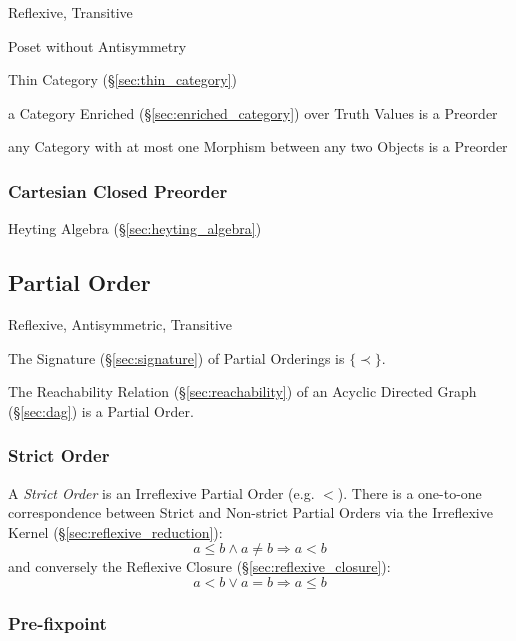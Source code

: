 Reflexive, Transitive

Poset without Antisymmetry

Thin Category (\S\ref{sec:thin_category})

a Category Enriched (\S\ref{sec:enriched_category}) over Truth Values
is a Preorder

any Category with at most one Morphism between any two Objects is a Preorder



\subsubsection{Cartesian Closed Preorder}\label{sec:cartesian_preorder}

Heyting Algebra (\S\ref{sec:heyting_algebra})



\subsection{Partial Order}\label{sec:partial_order}

Reflexive, Antisymmetric, Transitive

The Signature (\S\ref{sec:signature}) of Partial Orderings is
$\{\prec\}$.

The Reachability Relation (\S\ref{sec:reachability}) of an Acyclic
Directed Graph (\S\ref{sec:dag}) is a Partial Order.



\subsubsection{Strict Order}\label{sec:strict_order}

A \emph{Strict Order} is an Irreflexive Partial Order (e.g. $<$).
There is a one-to-one correspondence between Strict and Non-strict
Partial Orders via the Irreflexive Kernel
(\S\ref{sec:reflexive_reduction}):
\[
  a \leq b \wedge a \neq b \Rightarrow a < b
\]
and conversely the Reflexive Closure (\S\ref{sec:reflexive_closure}):
\[
  a < b \vee a = b \Rightarrow a \leq b
\]



\subsubsection{Pre-fixpoint}\label{sec:prefixpoint}

